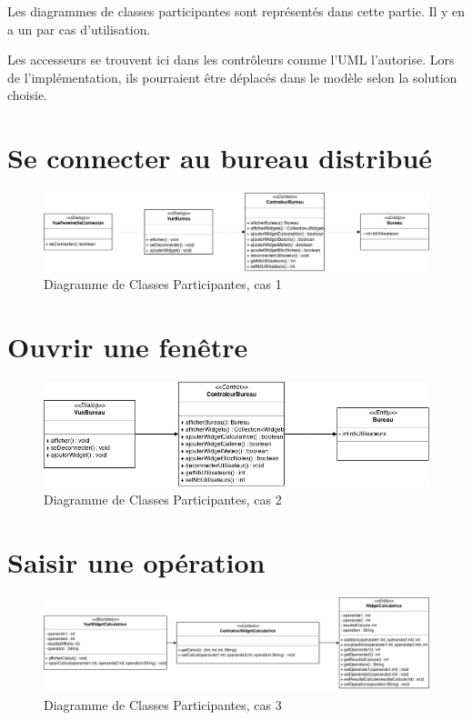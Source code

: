 Les diagrammes de classes participantes sont représentés dans cette 
partie. Il y en a un par cas d'utilisation.

Les accesseurs se trouvent ici dans les contrôleurs comme l'UML l'autorise. Lors de l'implémentation, ils pourraient être déplacés dans le modèle selon la solution choisie.

\section{Se connecter au bureau distribué}

\begin{figure}[H]
	\centering
	\includegraphics[scale=0.3]{diagrammes/DCP1.png}
	\caption{Diagramme de Classes Participantes, cas 1}
\end{figure}

\section{Ouvrir une fenêtre}

\begin{figure}[H]
	\centering
	\includegraphics[scale=0.4]{diagrammes/DCP2.png}
	\caption{Diagramme de Classes Participantes, cas 2}
\end{figure}

\section{Saisir une opération}

\begin{figure}[H]
	\centering
	\includegraphics[scale=0.3]{diagrammes/DCP3.png}
	\caption{Diagramme de Classes Participantes, cas 3}
\end{figure}

